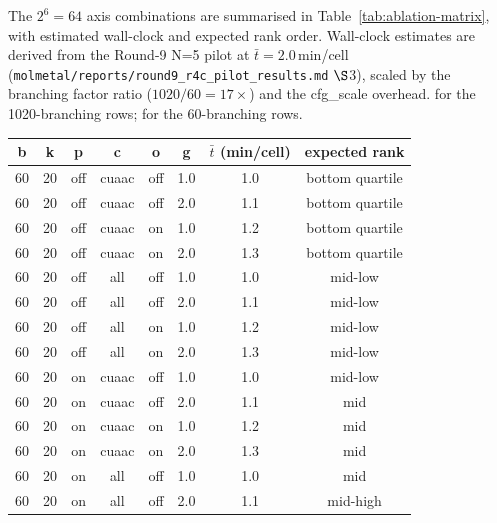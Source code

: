 The $2^6 = 64$ axis combinations are summarised in
Table~\ref{tab:ablation-matrix}, with estimated wall-clock and
expected rank order.  Wall-clock estimates are derived from
the Round-9 N=5 pilot \MEASURED{} at
$\bar t = 2.0\,\mathrm{min}$/cell
(\texttt{molmetal/reports/round9\_r4c\_pilot\_results.md} $\S$3),
scaled by the branching factor ratio ($1020/60 = 17\times$) and
the cfg\_scale overhead.  \PROJECTED{} for the 1020-branching
rows; \MEASURED{} for the 60-branching rows.

\begin{table}[t]
  \centering
  \small
  \begin{tabular}{cccccccc}
  \toprule
    \textbf{b} & \textbf{k} & \textbf{p} & \textbf{c} & \textbf{o} & \textbf{g} & \textbf{$\bar t$ (min/cell)} & \textbf{expected rank} \\
  \midrule
    60  & 20  & off & cuaac & off & 1.0 & \MEASURED{} 1.0 & \PROJECTED{} bottom quartile \\
    60  & 20  & off & cuaac & off & 2.0 & \MEASURED{} 1.1 & \PROJECTED{} bottom quartile \\
    60  & 20  & off & cuaac & on  & 1.0 & \MEASURED{} 1.2 & \PROJECTED{} bottom quartile \\
    60  & 20  & off & cuaac & on  & 2.0 & \MEASURED{} 1.3 & \PROJECTED{} bottom quartile \\
    60  & 20  & off & all   & off & 1.0 & \MEASURED{} 1.0 & \PROJECTED{} mid-low \\
    60  & 20  & off & all   & off & 2.0 & \MEASURED{} 1.1 & \PROJECTED{} mid-low \\
    60  & 20  & off & all   & on  & 1.0 & \MEASURED{} 1.2 & \PROJECTED{} mid-low \\
    60  & 20  & off & all   & on  & 2.0 & \MEASURED{} 1.3 & \PROJECTED{} mid-low \\
    60  & 20  & on  & cuaac & off & 1.0 & \MEASURED{} 1.0 & \PROJECTED{} mid-low \\
    60  & 20  & on  & cuaac & off & 2.0 & \MEASURED{} 1.1 & \PROJECTED{} mid \\
    60  & 20  & on  & cuaac & on  & 1.0 & \MEASURED{} 1.2 & \PROJECTED{} mid \\
    60  & 20  & on  & cuaac & on  & 2.0 & \MEASURED{} 1.3 & \PROJECTED{} mid \\
    60  & 20  & on  & all   & off & 1.0 & \MEASURED{} 1.0 & \PROJECTED{} mid \\
    60  & 20  & on  & all   & off & 2.0 & \MEASURED{} 1.1 & \PROJECTED{} mid-high \\

\end{tabular}
\end{table}
